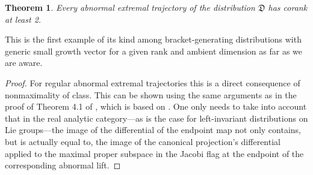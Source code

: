 \documentclass[11pt,letterpaper]{amsart}
\newtheorem{theorem}{Theorem}[section]
\numberwithin{equation}{section}
\begin{document}
\begin{theorem}
\label{corank2}
Every abnormal extremal trajectory of the distribution $\mathfrak D$ has corank at least 2.
\end{theorem}
 This is the first example of its kind among bracket-generating distributions with generic small growth vector for a given rank and ambient dimension as far as we are aware.
\begin{proof} 
For regular abnormal extremal trajectories this is a direct consequence of nonmaximality of class. 
This can be shown using the same arguments as in the proof of Theorem 4.1 of \cite{day2025canonicalframes},  which is based on \cite[Section 4]{Agrachev-Sarychev}. One only needs to take into account that in the real analytic category—as is the case for left-invariant distributions on Lie groups—the image of the differential of the endpoint map not only contains, but is actually equal to, the image of the canonical projection's differential applied to the maximal proper subspace in the Jacobi flag at the endpoint of the corresponding abnormal lift. 


\end{proof}
\end{document}
